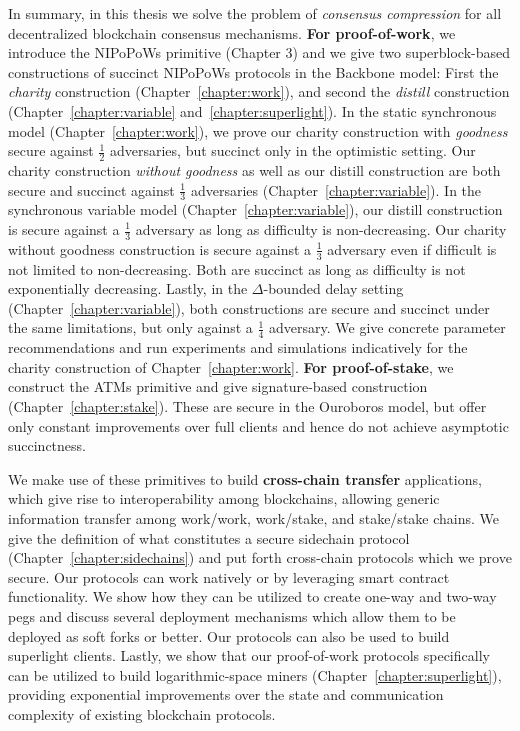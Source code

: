 In summary, in this thesis we solve the problem of \emph{consensus compression}
for all decentralized blockchain consensus mechanisms. \textbf{For
proof-of-work}, we introduce the NIPoPoWs primitive (Chapter 3) and we give two
superblock-based constructions of succinct NIPoPoWs protocols in the Backbone
model: First the \emph{charity} construction (Chapter~\ref{chapter:work}), and
second the \emph{distill} construction (Chapter~\ref{chapter:variable}
and~\ref{chapter:superlight}). In the static synchronous model
(Chapter~\ref{chapter:work}), we prove our charity construction with
\emph{goodness} secure against $\frac{1}{2}$ adversaries, but succinct only in
the optimistic setting. Our charity construction \emph{without goodness} as well
as our distill construction are both secure and succinct against $\frac{1}{3}$
adversaries (Chapter~\ref{chapter:variable}). In the synchronous variable model
(Chapter~\ref{chapter:variable}), our distill construction is secure against a
$\frac{1}{3}$ adversary as long as difficulty is non-decreasing. Our charity
without goodness construction is secure against a $\frac{1}{3}$ adversary even
if difficult is not limited to non-decreasing. Both are succinct as long as
difficulty is not exponentially decreasing. Lastly, in the $\Delta$-bounded
delay setting (Chapter~\ref{chapter:variable}), both constructions are secure
and succinct under the same limitations, but only against a $\frac{1}{4}$
adversary. We give concrete parameter recommendations and run experiments and
simulations indicatively for the charity construction of
Chapter~\ref{chapter:work}. \textbf{For proof-of-stake}, we construct the ATMs
primitive and give signature-based construction (Chapter~\ref{chapter:stake}).
These are secure in the Ouroboros model, but offer only constant improvements
over full clients and hence do not achieve asymptotic succinctness.

We make use of these primitives to build \textbf{cross-chain transfer}
applications, which give rise to interoperability among blockchains, allowing
generic information transfer among work/work, work/stake, and stake/stake
chains. We give the definition of what constitutes a secure sidechain protocol
(Chapter~\ref{chapter:sidechains}) and put forth cross-chain protocols which we
prove secure. Our protocols can work natively or by leveraging smart contract
functionality. We show how they can be utilized to create one-way and two-way
pegs and discuss several deployment mechanisms which allow them to be deployed
as soft forks or better. Our protocols can also be used to build superlight
clients. Lastly, we show that our proof-of-work protocols specifically can be
utilized to build logarithmic-space miners (Chapter~\ref{chapter:superlight}),
providing exponential improvements over the state and communication complexity
of existing blockchain protocols.


